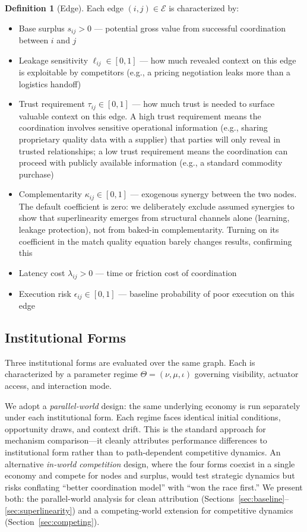 \documentclass[12pt]{article}
\theoremstyle{definition}
\newtheorem{definition}{Definition}
\begin{document}
\begin{definition}[Edge]
Each edge $(i,j) \in \mathcal{E}$ is characterized by:
\begin{itemize}
\item Base surplus $s_{ij} > 0$ --- potential gross value from successful coordination between $i$ and $j$
\item Leakage sensitivity $\ell_{ij} \in [0,1]$ --- how much revealed context on this edge is exploitable by competitors (e.g., a pricing negotiation leaks more than a logistics handoff)
\item Trust requirement $\tau_{ij} \in [0,1]$ --- how much trust is needed to surface valuable context on this edge. A high trust requirement means the coordination involves sensitive operational information (e.g., sharing proprietary quality data with a supplier) that parties will only reveal in trusted relationships; a low trust requirement means the coordination can proceed with publicly available information (e.g., a standard commodity purchase)
\item Complementarity $\kappa_{ij} \in [0,1]$ --- exogenous synergy between the two nodes. The default coefficient is zero: we deliberately exclude assumed synergies to show that superlinearity emerges from structural channels alone (learning, leakage protection), not from baked-in complementarity. Turning on its coefficient in the match quality equation barely changes results, confirming this
\item Latency cost $\lambda_{ij} > 0$ --- time or friction cost of coordination
\item Execution risk $\epsilon_{ij} \in [0,1]$ --- baseline probability of poor execution on this edge
\end{itemize}
\end{definition}

\subsection{Institutional Forms}

Three institutional forms are evaluated over the same graph. Each is characterized by a parameter regime $\Theta = (\nu, \mu, \iota)$ governing visibility, actuator access, and interaction mode.

\begin{remark}
We adopt a \textit{parallel-world} design: the same underlying economy is run separately under each institutional form. Each regime faces identical initial conditions, opportunity draws, and context drift. This is the standard approach for mechanism comparison---it cleanly attributes performance differences to institutional form rather than to path-dependent competitive dynamics. An alternative \textit{in-world competition} design, where the four forms coexist in a single economy and compete for nodes and surplus, would test strategic dynamics but risks conflating ``better coordination model'' with ``won the race first.'' We present both: the parallel-world analysis for clean attribution (Sections~\ref{sec:baseline}--\ref{sec:superlinearity}) and a competing-world extension for competitive dynamics (Section~\ref{sec:competing}).
\end{remark}
\end{document}
